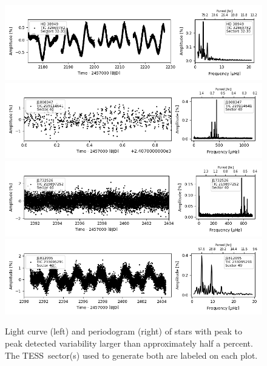 \documentclass[twocolumn, linenumbers]{aastex631}
\newcommand{\tess}{TESS}
\begin{document}
\begin{figure}
    \centering
    \includegraphics[width=0.9\linewidth]{figures/tic00000032869782_s323_norm1.fits.png}
    \includegraphics[width=0.9\linewidth]{figures/tic00000219114641_s040_flat2.fits.png}
    \includegraphics[width=0.9\linewidth]{figures/tic00000219897252_s040_norm1.fits.png}
    \includegraphics[width=0.9\linewidth]{figures/tic00000233095291_s040_flat1.fits.png}
    \caption{Light curve (left) and periodogram (right) of stars with peak to peak detected variability larger than approximately half a percent. The \tess\ sector(s) used to generate both are labeled on each plot.}
    \label{fig:lcft1}
\end{figure}
\end{document}
